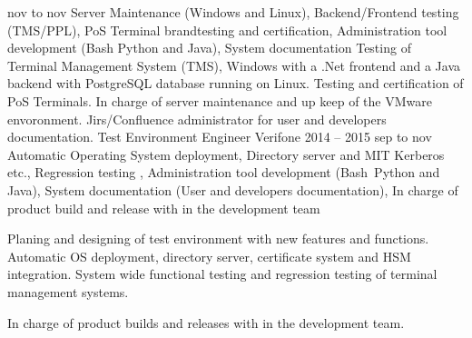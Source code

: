 \documentclass{sobCV}[2017/07/08]
\begin{document}
      {nov to nov}{                           %
      Server Maintenance (Windows and Linux),
      Backend/Frontend testing (TMS/PPL),
      PoS Terminal brandtesting and certification,
      Administration tool development (Bash Python and Java),
      System documentation
      }{
      Testing of Terminal Management System (TMS), Windows with a .Net 
      frontend and a Java backend with PostgreSQL database running on Linux.  
      Testing and certification of PoS Terminals. In charge of server 
      maintenance and up keep of the VMware envoronment. Jirs/Confluence 
      administrator for user and developers documentation.
      }
      \experiencenode
      {Test Environment Engineer}             %
      {Verifone}                              %
      {2014 -- 2015}                          %
      {sep to nov}{                           %
      Automatic Operating System deployment,
      Directory server and MIT Kerberos etc.,
      Regression testing ,
      Administration tool development (Bash\, Python and Java),
      System documentation (User and developers documentation),
      In charge of product build and release with in the development team
      }{
      Planing and designing of test environment with new features and 
      functions. Automatic OS deployment, directory server, certificate system 
      and HSM integration. System wide functional testing and regression 
      testing of terminal management systems.

      In charge of product builds and releases with in the development team.
      }
\end{document}
